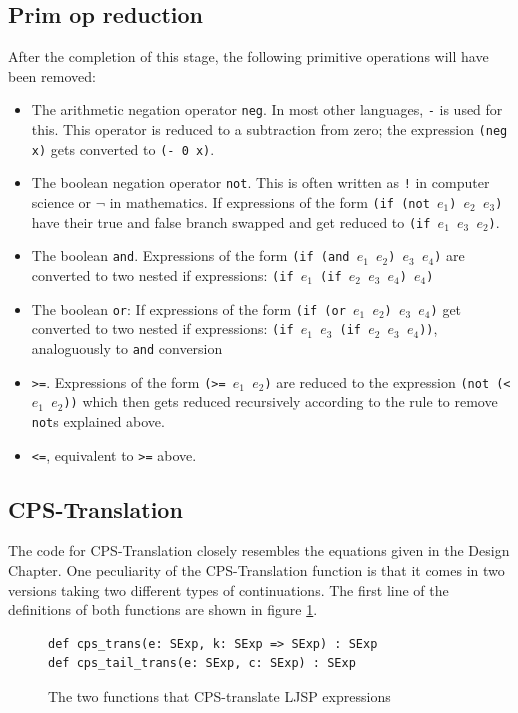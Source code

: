\documentclass[11pt]{report}
\begin{document}
\subsection{Prim op reduction}
After the completion of this stage, the following primitive operations will have been removed: 
\begin{itemize}
\item The arithmetic negation operator \texttt{neg}. In most other languages, \texttt{-} is used for this. This operator is reduced to a subtraction from zero; the expression \texttt{(neg x)} gets converted to \texttt{(- 0 x)}.
\item The boolean negation operator \texttt{not}. This is often written as \texttt{!} in computer science or $\neg$ in mathematics. If expressions of the form \texttt{(if (not $e_1$) $e_2$ $e_3$)} have their true and false branch swapped and get reduced to \texttt{(if $e_1$ $e_3$ $e_2$)}.
\item The boolean \texttt{and}. Expressions of the form \texttt{(if (and $e_1$ $e_2$) $e_3$ $e_4$)} are converted to two nested if expressions: \texttt{(if $e_1$ (if $e_2$ $e_3$ $e_4$) $e_4$)}
\item The boolean \texttt{or}: If expressions of the form \texttt{(if (or $e_1$ $e_2$) $e_3$ $e_4$)} get converted to two nested if expressions: \texttt{(if $e_1$ $e_3$ (if $e_2$ $e_3$ $e_4$))}, analoguously to \texttt{and} conversion
\item \texttt{>=}. Expressions of the form \texttt{(>= $e_1$ $e_2$)} are reduced to the expression \texttt{(not (< $e_1$ $e_2$))} which then gets reduced recursively according to the rule to remove \texttt{not}s explained above.
\item \texttt{<=}, equivalent to \texttt{>=} above.
\end{itemize}

\subsection{CPS-Translation}
The code for CPS-Translation closely resembles the equations given in the Design Chapter. One peculiarity of the CPS-Translation function is that it comes in two versions taking two different types of continuations. The first line of the definitions of both functions are shown in figure \ref{cpstranstwofuncs}.

\begin{figure}[ht]
\begin{lstlisting}
def cps_trans(e: SExp, k: SExp => SExp) : SExp
def cps_tail_trans(e: SExp, c: SExp) : SExp
\end{lstlisting}
\caption{The two functions that CPS-translate LJSP expressions}
\label{cpstranstwofuncs}
\end{figure}
\end{document}
